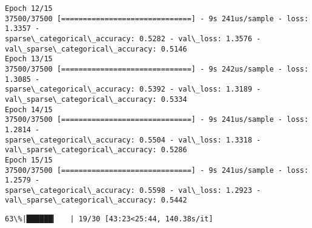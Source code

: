 \documentclass[11pt]{article}
\begin{document}
\begin{Verbatim}[commandchars=\\\{\}]
Epoch 12/15
37500/37500 [==============================] - 9s 241us/sample - loss: 1.3357 -
sparse\_categorical\_accuracy: 0.5282 - val\_loss: 1.3576 -
val\_sparse\_categorical\_accuracy: 0.5146
Epoch 13/15
37500/37500 [==============================] - 9s 242us/sample - loss: 1.3085 -
sparse\_categorical\_accuracy: 0.5392 - val\_loss: 1.3189 -
val\_sparse\_categorical\_accuracy: 0.5334
Epoch 14/15
37500/37500 [==============================] - 9s 241us/sample - loss: 1.2814 -
sparse\_categorical\_accuracy: 0.5504 - val\_loss: 1.3318 -
val\_sparse\_categorical\_accuracy: 0.5286
Epoch 15/15
37500/37500 [==============================] - 9s 241us/sample - loss: 1.2579 -
sparse\_categorical\_accuracy: 0.5598 - val\_loss: 1.2923 -
val\_sparse\_categorical\_accuracy: 0.5442
    \end{Verbatim}

    \begin{Verbatim}[commandchars=\\\{\}]
 63\%|██████▎   | 19/30 [43:23<25:44, 140.38s/it]
    \end{Verbatim}
\end{document}
